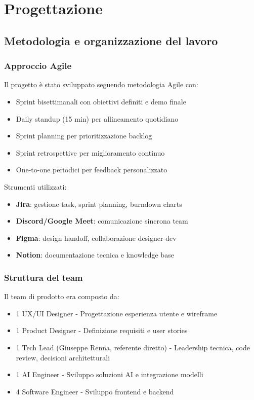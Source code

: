 \chapter{Progettazione}

\section{Metodologia e organizzazione del lavoro}
\subsection{Approccio Agile}
Il progetto è stato sviluppato seguendo metodologia Agile con:
\begin{itemize}
  \item Sprint bisettimanali con obiettivi definiti e demo finale
  \item Daily standup (15 min) per allineamento quotidiano
  \item Sprint planning per prioritizzazione backlog
  \item Sprint retrospettive per miglioramento continuo
  \item One-to-one periodici per feedback personalizzato
\end{itemize}

Strumenti utilizzati:
\begin{itemize}
  \item \textbf{Jira}: gestione task, sprint planning, burndown charts
  \item \textbf{Discord/Google Meet}: comunicazione sincrona team
  \item \textbf{Figma}: design handoff, collaborazione designer-dev
  \item \textbf{Notion}: documentazione tecnica e knowledge base
\end{itemize}

\subsection{Struttura del team}
Il team di prodotto era composto da:
\begin{itemize}
  \item 1 UX/UI Designer - Progettazione esperienza utente e wireframe
  \item 1 Product Designer - Definizione requisiti e user stories
  \item 1 Tech Lead (Giuseppe Renna, referente diretto) - Leadership 
        tecnica, code review, decisioni architetturali
  \item 1 AI Engineer - Sviluppo soluzioni AI e integrazione modelli
  \item 4 Software Engineer - Sviluppo frontend e backend
\end{itemize}

